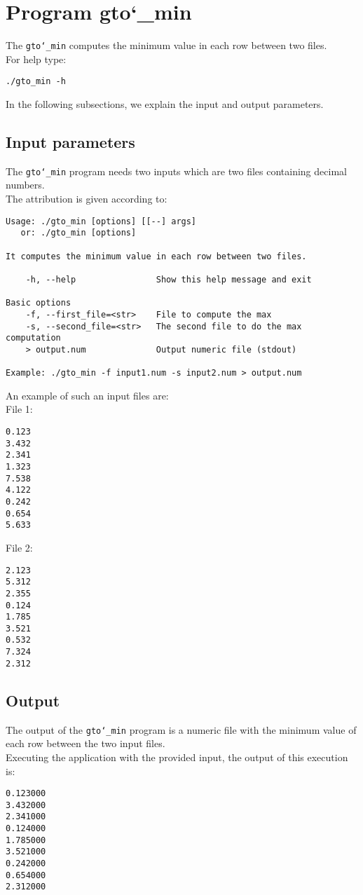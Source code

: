 \section{Program gto\char`_min}
The \texttt{gto\char`_min} computes the minimum value in each row between two files.\\
For help type:
\begin{lstlisting}
./gto_min -h
\end{lstlisting}
In the following subsections, we explain the input and output parameters.

\subsection*{Input parameters}

The \texttt{gto\char`_min}  program needs two inputs which are two files containing decimal numbers.\\

The attribution is given according to:
\begin{lstlisting}
Usage: ./gto_min [options] [[--] args]
   or: ./gto_min [options]

It computes the minimum value in each row between two files.

    -h, --help                Show this help message and exit

Basic options
    -f, --first_file=<str>    File to compute the max
    -s, --second_file=<str>   The second file to do the max computation
    > output.num              Output numeric file (stdout)

Example: ./gto_min -f input1.num -s input2.num > output.num
\end{lstlisting}
An example of such an input files are:\\
File 1:
\begin{lstlisting}
0.123
3.432
2.341
1.323
7.538
4.122
0.242
0.654
5.633
\end{lstlisting}
File 2:
\begin{lstlisting}
2.123
5.312
2.355
0.124
1.785
3.521
0.532
7.324
2.312
\end{lstlisting}

\subsection*{Output}
The output of the \texttt{gto\char`_min} program is a numeric file with the minimum value of each row between the two input files.\\
Executing the application with the provided input, the output of this execution is:
\begin{lstlisting}
0.123000
3.432000
2.341000
0.124000
1.785000
3.521000
0.242000
0.654000
2.312000
\end{lstlisting}